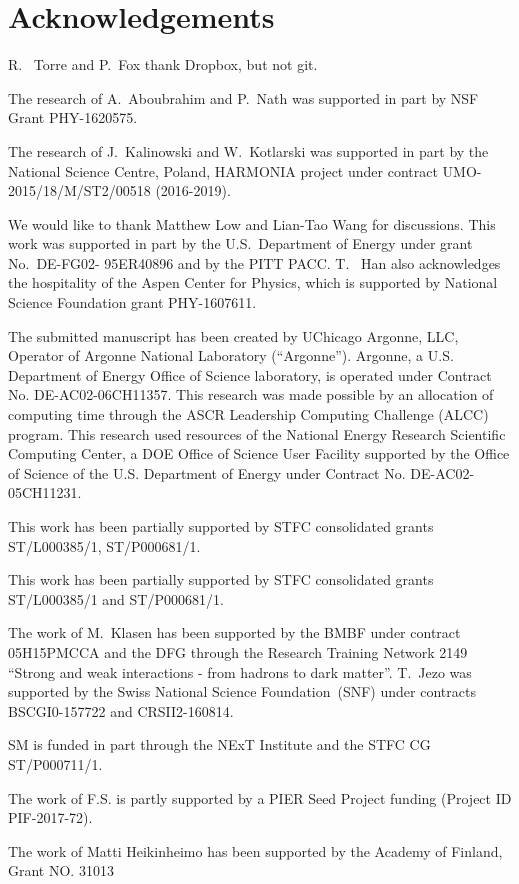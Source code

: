 \section{Acknowledgements}
R.~ Torre and P.~Fox thank Dropbox, but not git.



The research of  A.~Aboubrahim  and P.~Nath was supported in part by NSF Grant PHY-1620575.

The research of J.~Kalinowski and W.~Kotlarski was supported in part by 
the National Science Centre, Poland,  HARMONIA project under contract UMO-2015/18/M/ST2/00518 (2016-2019).

We would like to thank Matthew Low and Lian-Tao Wang for discussions. This work was supported in part by the U.S.~Department of Energy under grant No.~DE-FG02- 95ER40896 and by the PITT PACC. T.~ Han also acknowledges the hospitality of the Aspen Center for Physics, which is supported by National Science Foundation grant PHY-1607611.

The submitted manuscript has been created by UChicago Argonne, LLC,
Operator of Argonne National Laboratory (``Argonne'').
Argonne, a U.S. Department of Energy Office of Science laboratory,
is operated under Contract No. DE-AC02-06CH11357.
This research was made possible by an allocation of computing time through the ASCR Leadership Computing Challenge (ALCC) program. This research used resources of the National Energy Research Scientific Computing Center, a DOE Office of Science User Facility supported by the Office of Science of the U.S. Department of Energy under Contract No. DE-AC02-05CH11231.

This work has been partially supported by STFC consolidated grants ST/L000385/1, ST/P000681/1.

This work has been partially supported by STFC consolidated grants ST/L000385/1 and ST/P000681/1.

The work of M.~Klasen has been supported by the BMBF under contract 05H15PMCCA and the DFG through the Research Training Network 2149
``Strong and weak interactions - from hadrons to dark matter''.
T.~Jezo was supported by the Swiss National Science Foundation~(SNF) under contracts BSCGI0-157722 and CRSII2-160814.

SM is funded in part through the NExT Institute and the STFC CG ST/P000711/1.

The work of F.S. is partly supported by a PIER Seed Project funding (Project ID PIF-2017-72).

The work of Matti Heikinheimo has been supported by the Academy of Finland, Grant NO. 31013